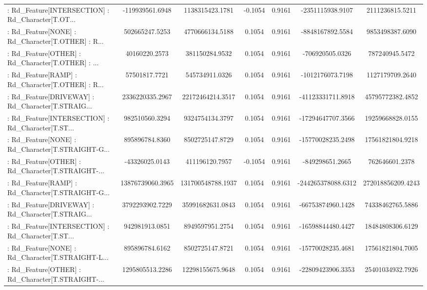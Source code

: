 \begin{longtable}{p{4cm}cccccc}
 : Rd\_Feature[INTERSECTION] : Rd\_Character[T.OT... &   -119939561.6948 &   1138315423.1781 & -0.1054 &       0.9161 &   -2351115938.9107 &   2111236815.5211 \\
 : Rd\_Feature[NONE] : Rd\_Character[T.OTHER] : R... &    502665247.5253 &   4770666134.5188 &  0.1054 &       0.9161 &   -8848167892.5584 &   9853498387.6090 \\
 : Rd\_Feature[OTHER] : Rd\_Character[T.OTHER] : ... &     40160220.2573 &    381150284.9532 &  0.1054 &       0.9161 &    -706920505.0326 &    787240945.5472 \\
 : Rd\_Feature[RAMP] : Rd\_Character[T.OTHER] : R... &     57501817.7721 &    545734911.0326 &  0.1054 &       0.9161 &   -1012176073.7198 &   1127179709.2640 \\
 : Rd\_Feature[DRIVEWAY] : Rd\_Character[T.STRAIG... &   2336220335.2967 &  22172464214.3517 &  0.1054 &       0.9161 &  -41123331711.8918 &  45795772382.4852 \\
 : Rd\_Feature[INTERSECTION] : Rd\_Character[T.ST... &    982510560.3294 &   9324754134.3797 &  0.1054 &       0.9161 &  -17294647707.3566 &  19259668828.0155 \\
 : Rd\_Feature[NONE] : Rd\_Character[T.STRAIGHT-G... &    895896784.8360 &   8502725147.8729 &  0.1054 &       0.9161 &  -15770028235.2498 &  17561821804.9218 \\
 : Rd\_Feature[OTHER] : Rd\_Character[T.STRAIGHT-... &    -43326025.0143 &    411196120.7957 & -0.1054 &       0.9161 &    -849298651.2665 &    762646601.2378 \\
 : Rd\_Feature[RAMP] : Rd\_Character[T.STRAIGHT-G... &  13876739060.3965 & 131700548788.1937 &  0.1054 &       0.9161 & -244265378088.6312 & 272018856209.4243 \\
 : Rd\_Feature[DRIVEWAY] : Rd\_Character[T.STRAIG... &   3792293902.7229 &  35991682631.0843 &  0.1054 &       0.9161 &  -66753874960.1428 &  74338462765.5886 \\
 : Rd\_Feature[INTERSECTION] : Rd\_Character[T.ST... &    942981913.0851 &   8949597951.2754 &  0.1054 &       0.9161 &  -16598844480.4427 &  18484808306.6129 \\
 : Rd\_Feature[NONE] : Rd\_Character[T.STRAIGHT-L... &    895896784.6162 &   8502725147.8721 &  0.1054 &       0.9161 &  -15770028235.4681 &  17561821804.7005 \\
 : Rd\_Feature[OTHER] : Rd\_Character[T.STRAIGHT-... &   1295805513.2286 &  12298155675.9648 &  0.1054 &       0.9161 &  -22809423906.3353 &  25401034932.7926 \\

\end{longtable}
